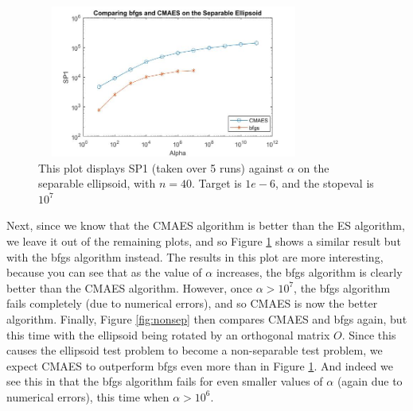 \documentclass[sigconf, 6pt]{acmart}
\begin{document}
\begin{figure}[h]
\centering
  \includegraphics[height = 5cm, width=9cm]{A3separable40.jpg}
  \caption{This plot displays SP1 (taken over 5 runs) against $\alpha$ on the separable ellipsoid, with $n = 40$. Target is $1e-6$, and the stopeval is $10^7$}
  \label{fig:sep}
\end{figure}

Next, since we know that the CMAES algorithm is better than the ES algorithm, we leave it out of the remaining plots, and so Figure \ref{fig:sep} shows a similar result but with the bfgs algorithm instead. The results in this plot are more interesting, because you can see that as the value of $\alpha$ increases, the bfgs algorithm is clearly better than the CMAES algorithm. However, once $\alpha>10^7$, the bfgs algorithm fails completely (due to numerical errors), and so CMAES is now the better algorithm. Finally, Figure \ref{fig:nonsep} then compares CMAES and bfgs again, but this time with the ellipsoid being rotated by an orthogonal matrix $O$. Since this causes the ellipsoid test problem to become a non-separable test problem, we expect CMAES to outperform bfgs even more than in Figure \ref{fig:sep}. And indeed we see this in that the bfgs algorithm fails for even smaller values of $\alpha$ (again due to numerical errors), this time when $\alpha>10^6$. 
\end{document}
